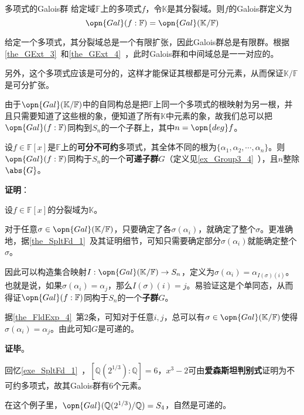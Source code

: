 \begin{definition}{多项式的Galois群}
给定域$\mathbb{F}$上的多项式$f$，令$\mathbb{K}$是其分裂域。则$f$的Galois群定义为
\begin{equation}
\opn{Gal}(f:\mathbb{F})=\opn{Gal}(\mathbb{K}/\mathbb{F})
\end{equation}
\end{definition}

给定一个多项式，其分裂域总是一个有限扩张，因此Galois群总是有限群。根据\autoref{the_GExt_3}~和\autoref{the_GExt_4}~，此时Galois群和中间域总是一一对应的。

另外，这个多项式应该是可分的，这样才能保证其根都是可分元素，从而保证$\mathbb{K}/\mathbb{F}$是可分扩张。

由于$\opn{Gal}(\mathbb{K}/\mathbb{F})$中的自同构总是把$\mathbb{F}$上同一个多项式的根映射为另一根，并且只需要知道了这些根的象，便知道了所有$\mathbb{K}$中元素的象，故我们总可以把$\opn{Gal}(f:\mathbb{F})$同构到$S_n$的一个子群上，其中$n=\opn{deg}f$。

\begin{theorem}{}\label{the_PlyRtS_1}
设$f\in\mathbb{F}[x]$是$\mathbb{F}$上的\textbf{可分不可约}多项式，其全体不同的根为$\{\alpha_1, \alpha_2, \cdots, \alpha_n\}$。则$\opn{Gal}(f:\mathbb{F})$同构于$S_n$的一个\textbf{可递子群}$G$（定义见\autoref{ex_Group3_4}~），且$n$整除$\abs{G}$。
\end{theorem}

\textbf{证明}：

设$f\in\mathbb{F}[x]$的分裂域为$\mathbb{K}$。

对于任意$\sigma\in\opn{Gal}(\mathbb{K}/\mathbb{F})$，只要确定了各$\sigma(\alpha_i)$，就确定了整个$\sigma$。更准确地，据\autoref{the_SpltFd_1}~及其证明细节，可知只需要确定部分$\sigma(\alpha_i)$就能确定整个$\sigma$。

因此可以构造集合映射$I:\opn{Gal}(\mathbb{K}/\mathbb{F})\to S_n$，定义为$\sigma(\alpha_i)=\alpha_{I(\sigma)(i)}$。也就是说，如果$\sigma(\alpha_i)=\alpha_j$，那么$I(\sigma)(i)=j$。易验证这是个单同态，从而得证$\opn{Gal}(f:\mathbb{F})$同构于$S_n$的一个\textbf{子群}$G$。

据\autoref{the_FldExp_4}~第2条，可知对于任意$i, j$，总可以有$\sigma\in\opn{Gal}(\mathbb{K}/\mathbb{F})$使得$\sigma(\alpha_i)=\alpha_j$。由此可知$G$是可递的。

\textbf{证毕}。


\begin{example}{}
回忆\autoref{exe_SpltFd_1}~，$[\mathbb{Q}(2^{1/3}):\mathbb{Q}]=6$，$x^3-2$可由\textbf{爱森斯坦判别式}证明为不可约多项式，故其Galois群有6个元素。

在这个例子里，$\opn{Gal}(\mathbb{Q}(2^{1/3})/\mathbb{Q})=S_4$，自然是可递的。
\end{example}

